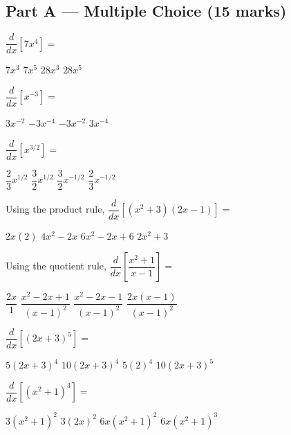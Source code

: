 \documentclass[addpoints]{exam}
\begin{document}
\newpage
\begin{questions}

\section*{Part A --- Multiple Choice (15 marks)}
\vspace{5mm}

\question[1] $\dfrac{d}{dx}\!\left[7x^4\right] = $
\begin{choices}
    \choice $7x^3$
    \choice $7x^5$
    \correctchoice $28x^3$
    \choice $28x^5$
\end{choices}

\question[1] $\dfrac{d}{dx}\!\left[x^{-3}\right] = $
\begin{choices}
    \choice $3x^{-2}$
    \correctchoice $-3x^{-4}$
    \choice $-3x^{-2}$
    \choice $3x^{-4}$
\end{choices}

\question[1] $\dfrac{d}{dx}\!\left[x^{3/2}\right] = $
\begin{choices}
    \choice $\dfrac{2}{3}x^{1/2}$
    \correctchoice $\dfrac{3}{2}x^{1/2}$
    \choice $\dfrac{3}{2}x^{-1/2}$
    \choice $\dfrac{2}{3}x^{-1/2}$
\end{choices}

\question[1] Using the product rule, $\dfrac{d}{dx}\!\left[(x^2 + 3)(2x - 1)\right] = $
\begin{choices}
    \choice $2x(2)$
    \choice $4x^2 - 2x$
    \correctchoice $6x^2 - 2x + 6$
    \choice $2x^2 + 3$
\end{choices}

\question[1] Using the quotient rule, $\dfrac{d}{dx}\!\left[\dfrac{x^2 + 1}{x - 1}\right] = $
\begin{choices}
    \choice $\dfrac{2x}{1}$
    \choice $\dfrac{x^2 - 2x + 1}{(x-1)^2}$
    \correctchoice $\dfrac{x^2 - 2x - 1}{(x-1)^2}$
    \choice $\dfrac{2x(x-1)}{(x-1)^2}$
\end{choices}

\question[1] $\dfrac{d}{dx}\!\left[(2x + 3)^5\right] = $
\begin{choices}
    \choice $5(2x+3)^4$
    \correctchoice $10(2x+3)^4$
    \choice $5(2)^4$
    \choice $10(2x+3)^5$
\end{choices}

\question[1] $\dfrac{d}{dx}\!\left[(x^2 + 1)^3\right] = $
\begin{choices}
    \choice $3(x^2+1)^2$
    \choice $3(2x)^2$
    \correctchoice $6x(x^2+1)^2$
    \choice $6x(x^2+1)^3$
\end{choices}


\end{questions}
\end{document}
